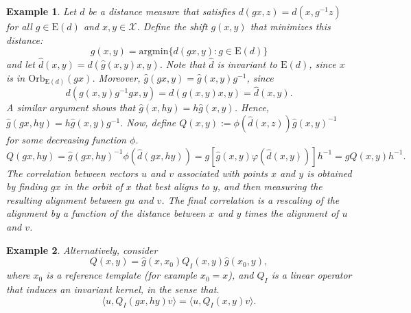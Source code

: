 \documentclass{article}
\newtheorem{example}{Example}
\newcommand{\euclid}[1]{\mathrm{E}(#1)}
\newcommand{\xspace}{\mathcal{X}}
\begin{document}
    \begin{example} Let $d$ be a distance measure that satisfies $d(gx,z)=d(x,g^{-1}z)$ for all $g\in\euclid{d}$ and $x,y\in \xspace$. Define the shift $g(x,y)$ that minimizes this distance:
    \[
        \widehat g(x,y) = \mathrm{argmin}\{d(gx, y)\colon g\in \euclid{d}\}
    \]
    and let $\widehat d(x,y)=d(\widehat g(x,y)x,y)$. Note that $\widehat d$ is invariant to $\euclid{d}$, since $x$ is in $\mathrm{Orb}_{\euclid{d}}(gx)$. Moreover, $\widehat{g}(gx,y)=\widehat{g}(x,y)g^{-1}$, since
    \[
        d(g(x,y)g^{-1}gx, y) = d(g(x,y)x,y)=\widehat{d}(x,y).
    \]
    A similar argument shows that $\widehat g(x,hy)=h\widehat g (x, y)$. Hence, $\widehat g(gx, hy)=h\widehat g(x,y) g^{-1}$. Now, define $Q(x,y):=\phi(\widehat d(x,z))\widehat g(x,y)^{-1}$ for some decreasing function $\phi$.
    \[
        Q(gx,hy) = \widehat g(gx, hy)^{-1}\phi(\widehat d(gx, hy)) = g\left[\widehat{g}(x, y)\varphi(\widehat{d}(x,y))\right]h^{-1} = gQ(x,y)h^{-1}.
    \]
    The correlation between vectors $u$ and $v$ associated with points $x$ and $y$ is obtained by finding $gx$ in the orbit of $x$ that best aligns to $y$, and then measuring the resulting alignment between $gu$ and $v$. The final correlation is a rescaling of the alignment by a function of the distance between $x$ and $y$ times the alignment of $u$ and $v$. 
    \end{example}
    \begin{example}
    Alternatively, consider
        \[
            Q(x, y) = \widehat{g}(x, x_0)Q_I(x,y)\widehat{g}(x_0,y),
        \]
        where $x_0$ is a reference template (for example $x_0=x$), and $Q_I$ is a linear operator that induces an invariant kernel, in the sense that.
        \[
            \langle u, Q_I(gx, hy)v\rangle = \langle u, Q_I(x, y) v\rangle.
        \]
    \end{example}
\end{document}
